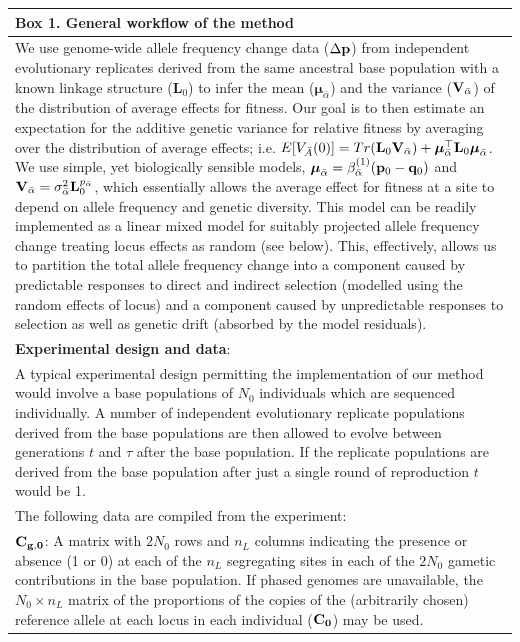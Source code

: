 \documentclass[12pt]{article}
\begin{document}
\begin{bibunit}
\begin{longtable}{|p{15cm}|}
\hline
\textbf{Box 1. General workflow of the method}\\
\hline
We use genome-wide allele frequency change data ($\Delta {\bf p}$) from independent evolutionary replicates derived from the same ancestral base population with a known linkage structure ($\textbf{L}_0$) to infer the mean ($\boldsymbol{\mu}_{\bar{\alpha}}$) and the variance (${\bf V}_{\bar{\alpha}}$) of the distribution of average effects for fitness. Our goal is to then estimate an expectation for the additive genetic variance for relative fitness by averaging over the distribution of average effects; i.e. $E[V_{\bar A}(0)] = Tr(\textbf{L}_0{\bf V}_{\bar{\alpha}}) + \boldsymbol{\mu}_{\bar{\alpha}}^{\top}\textbf{L}_0\boldsymbol{\mu}_{\bar{\alpha}}$. We use simple, yet biologically sensible models, $\boldsymbol{\mu}_{\bar{\alpha}} = \beta^{(1)}_{\bar{\alpha}}({\bf p}_{0}-{\bf q}_{0})$ and ${\bf V}_{\bar{\alpha}}=\sigma^2_{\bar{\alpha}}{\bf L}_{0}^{p_{\bar{\alpha}}}$, which essentially allows the average effect for fitness at a site to depend on allele frequency and genetic diversity. This model can be readily implemented as a linear mixed model for suitably projected allele frequency change treating locus effects as random (see below). This, effectively, allows us to partition the total allele frequency change into a component caused by predictable responses to direct and indirect selection (modelled using the random effects of locus) and a component caused by unpredictable responses to selection as well as genetic drift (absorbed by the model residuals).\\
\hline
\textbf{Experimental design and data}:\\
A typical experimental design permitting the implementation of our method would involve a base populations of $N_0$ individuals which are sequenced individually. A number of independent evolutionary replicate populations derived from the base populations are then allowed to evolve between generations $t$ and $\tau$ after the base population. If the replicate populations are derived from the base population after just a single round of reproduction $t$ would be 1. \\
The following data are compiled from the experiment: \\ 
$\bf{C}_{g,0}$: A matrix with $2N_0$ rows and $n_L$ columns indicating the presence or absence (1 or 0) at each of the $n_L$ segregating sites in each of the $2N_0$ gametic contributions in the base population. If phased genomes are unavailable, the $N_0 \times n_L$ matrix of the proportions of the copies of the (arbitrarily chosen) reference allele at each locus in each individual ($\bf{C}_0$) may be used. \\

\end{longtable}
\end{bibunit}
\end{document}
